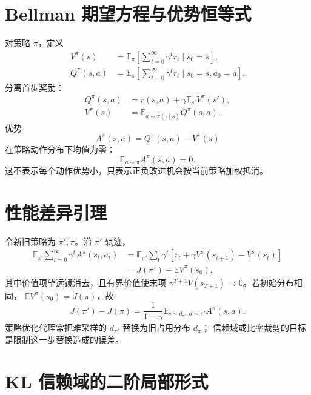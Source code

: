 \documentclass[11pt]{article}
\numberwithin{equation}{section}
\newcommand{\E}{\mathbb{E}}
\newcommand{\1}{\mathbf{1}}
\begin{document}
\section{Bellman 期望方程与优势恒等式}

对策略 $\pi$，定义
\begin{align}
 V^\pi(s)&=\E_\pi\left[\sum_{t=0}^{\infty}\gamma^tr_t\mid s_0=s\right],\\
 Q^\pi(s,a)&=\E_\pi\left[\sum_{t=0}^{\infty}\gamma^tr_t
 \mid s_0=s,a_0=a\right].
\end{align}
分离首步奖励：
\begin{align}
 Q^\pi(s,a)&=r(s,a)+\gamma\E_{s'}V^\pi(s'),\\
 V^\pi(s)&=\E_{a\sim\pi(\cdot\mid s)}Q^\pi(s,a).
\end{align}
优势
\begin{equation}
 A^\pi(s,a)=Q^\pi(s,a)-V^\pi(s)
\end{equation}
在策略动作分布下均值为零：
\begin{equation}
 \E_{a\sim\pi}A^\pi(s,a)=0.
\end{equation}
这不表示每个动作优势小，只表示正负改进机会按当前策略加权抵消。

\section{性能差异引理}

令新旧策略为 $\pi',\pi$。沿 $\pi'$ 轨迹，
\begin{align}
 \E_{\pi'}\sum_{t=0}^{\infty}\gamma^tA^\pi(s_t,a_t)
 &=\E_{\pi'}\sum_t\gamma^t
 [r_t+\gamma V^\pi(s_{t+1})-V^\pi(s_t)]\\
 &=J(\pi')-\E V^\pi(s_0),
\end{align}
其中价值项望远镜消去，且有界价值使末项
$\gamma^{T+1}V(s_{T+1})\to0$。若初始分布相同，
$\E V^\pi(s_0)=J(\pi)$，故
\begin{equation}
 \boxed{J(\pi')-J(\pi)
 =\frac1{1-\gamma}
 \E_{s\sim d_{\pi'},a\sim\pi'}A^\pi(s,a).}
\end{equation}
策略优化代理常把难采样的 $d_{\pi'}$ 替换为旧占用分布 $d_\pi$；
信赖域或比率裁剪的目标是限制这一步替换造成的误差。

\section{KL 信赖域的二阶局部形式}
\end{document}
